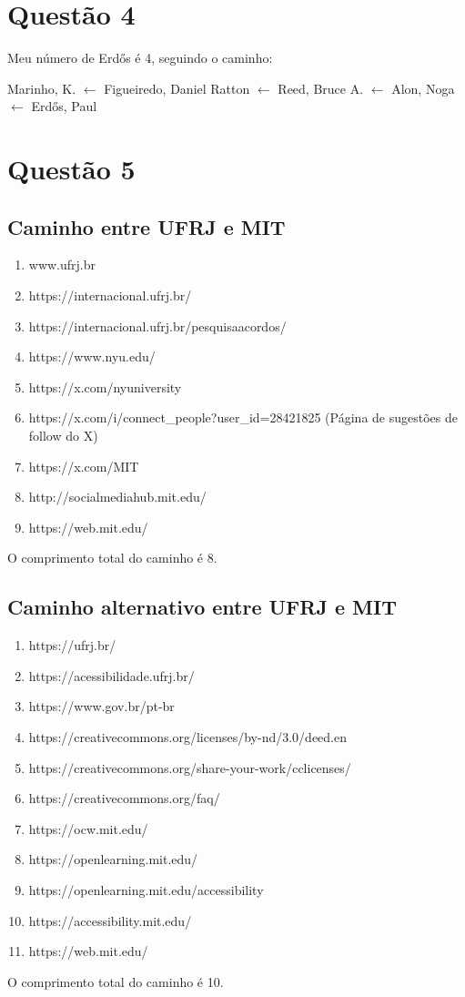 \documentclass{article}
\begin{document}
\section{Questão 4}
Meu número de Erdős é 4, seguindo o caminho:

Marinho, K. {$\leftarrow$} Figueiredo, Daniel Ratton {$\leftarrow$} Reed, Bruce A. {$\leftarrow$} Alon, Noga {$\leftarrow$} Erdős, Paul

\section{Questão 5}
\subsection{Caminho entre UFRJ e MIT}
\begin{enumerate}
    \item www.ufrj.br
    \item https://internacional.ufrj.br/
    \item https://internacional.ufrj.br/pesquisaacordos/
    \item https://www.nyu.edu/
    \item https://x.com/nyuniversity
    \item https://x.com/i/connect\_people?user\_id=28421825 (Página de sugestões de follow do X)
    \item https://x.com/MIT
    \item http://socialmediahub.mit.edu/
    \item https://web.mit.edu/
\end{enumerate}
    O comprimento total do caminho é 8.
\subsection{Caminho alternativo entre UFRJ e MIT}
\begin{enumerate}
    \item https://ufrj.br/
    \item https://acessibilidade.ufrj.br/
    \item https://www.gov.br/pt-br
    \item https://creativecommons.org/licenses/by-nd/3.0/deed.en
    \item https://creativecommons.org/share-your-work/cclicenses/
    \item https://creativecommons.org/faq/
    \item https://ocw.mit.edu/
    \item https://openlearning.mit.edu/
    \item https://openlearning.mit.edu/accessibility
    \item https://accessibility.mit.edu/
    \item https://web.mit.edu/
\end{enumerate}
    O comprimento total do caminho é 10.
\end{document}
